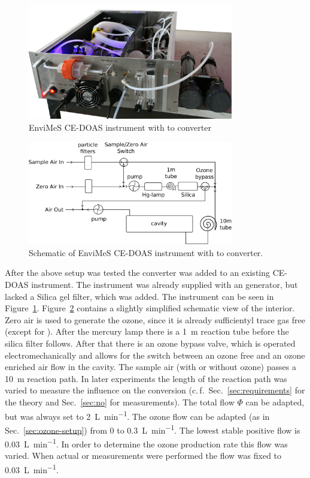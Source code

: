 \begin{figure}[htbp]
  \centering
  \includegraphics[width=0.8\textwidth]{images/InstrumentEdited_small.jpg}
  \caption{EnviMeS CE-DOAS instrument with  to 
    converter}
  \label{fig:envimes}
\end{figure}

\begin{figure}[htbp]
  \centering
  \includegraphics[width=0.8\textwidth]{images/envimes_setup.eps}
  \caption{Schematic of EnviMeS CE-DOAS instrument with  to
     converter.}
  \label{fig:envimes-schematic}
\end{figure}

After the above setup was tested the converter was added to an
existing CE-DOAS instrument. The instrument was already supplied with
an  generator, but lacked a Silica gel filter, which was
added. The instrument can be seen in
Figure~\ref{fig:envimes}. Figure~\ref{fig:envimes-schematic} contains
a slightly simplified schematic view of the interior. Zero air is
used to generate the ozone, since it is already sufficientyl trace gas
free (except for ). After the mercury lamp there is a
\SI{1}{\meter} reaction tube before the silica filter follows. After
that there is an ozone bypass valve, which is operated
electromechanically and allows for the switch between an ozone free and
an ozone enriched air flow in the cavity. The sample air (with or
without ozone) passes a \SI{10}{\meter} reaction path. In later
experiments the length of the reaction path was varied to measure the
influence on the  conversion (c.\,f.\
Sec.~\ref{sec:requirements} for the theory and Sec.~\ref{sec:no} for
measurements). The total flow $\Phi$ can be adapted, but was always
set to \SI{2}{\liter\per\minute}. The ozone flow can be adapted (as
in Sec.~\ref{sec:ozone-setup}) from 0 to
\SI{0.3}{\liter\per\minute}. The lowest stable positive flow is
\SI{0.03}{\liter\per\minute}. In order to determine the ozone production rate
this flow was varied. When actual \ch{NO} or \ch{NO_x} measurements
were performed the flow was fixed to \SI{0.03}{\liter\per\minute}.

